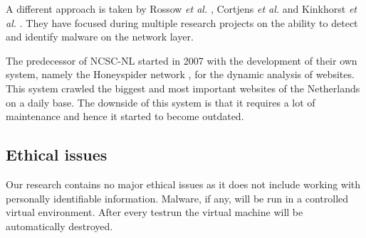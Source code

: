 A different approach is taken by Rossow \textit{et al.} \cite{Rossow2011}, Cortjens \textit{et al.} \cite{Cortjens2012} and Kinkhorst \textit{et al.} \cite{Kinkhorst2009}. They have focused during multiple research projects on the ability to detect and identify malware on the network layer.

The predecessor of NCSC-NL started in 2007 with the development of their own system, namely the Honeyspider network \cite{honeyspider}, for the dynamic analysis of websites. This system crawled the biggest and most important websites of the Netherlands on a daily base. The downside of this system is that it requires a lot of maintenance and hence it started to become outdated.


\iffalse
\subsection{Scope}

\todo{Zelfstandiger maken}

In this research project is an an algorithm created that allows multiple URLs to be opened at the same time while still being able to track all further interaction, such as unexpected HTTP requests and other malicious activity, and link them to the original request/URL. To prove that the algorithm is something feasible, a proof of concept of the algorithm has been implemented on top of the Cuckoo Sandbox.

The goal during this research project was to make the algorithm fully platform agnostic, however, several technical challenges prevented this. For this reason we limited our self to Windows 7 with version 8 of the Internet Explorer browser and have we the identified issues described.

The detection and identification of malicious behaviour was not part of this project. For our PoC we sticked to the detection of a well-known older and still to be determined malware family which existence is easy to detect on the system. 

\fi

\subsection{Ethical issues}

Our research contains no major ethical issues as it does not include working with personally identifiable information. Malware, if any, will be run in a controlled virtual environment. After every testrun the virtual machine will be automatically destroyed.

